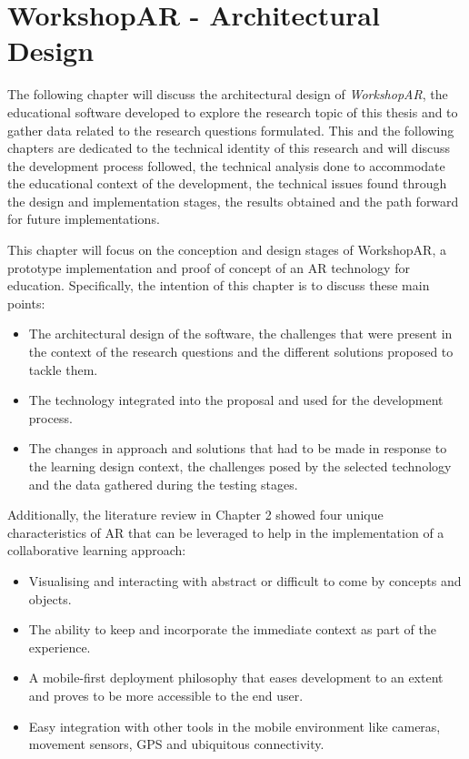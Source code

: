 \chapter{WorkshopAR - Architectural Design \label{ch4}}

The following chapter will discuss the architectural design of \emph{WorkshopAR}, the educational software developed to explore the research topic of this thesis and to
gather data related to the research questions formulated. This and the following chapters are dedicated to the technical identity of this research and will discuss the
development process followed, the technical analysis done to accommodate the educational context of the development, the technical issues found through the design and
implementation stages, the results obtained and the path forward for future implementations.

This chapter will focus on the conception and design stages of WorkshopAR, a prototype implementation and proof of concept of an \acf{AR} technology for education. Specifically,
the intention of this chapter is to discuss these  main points:

\begin{itemize}
    \item The architectural design of the software, the challenges that were present in the context of the research questions and the different solutions proposed to
    tackle them.
    \item The technology integrated into the proposal and used for the development process.
    \item The changes in approach and solutions that had to be made in response to the learning design context, the challenges posed by the selected technology and the
    data gathered during the testing stages.
\end{itemize}

Additionally, the literature review in Chapter 2 showed four unique characteristics of AR that can be leveraged to help in the implementation of a collaborative learning
approach:

\begin{itemize}
    \item Visualising and interacting with abstract or difficult to come by concepts and objects.
    \item The ability to keep and incorporate the immediate context as part of the experience.
    \item A mobile-first deployment philosophy that eases development to an extent and proves to be more accessible to the end user.
    \item Easy integration with other tools in the mobile environment like cameras, movement sensors, GPS and ubiquitous connectivity.
\end{itemize}


